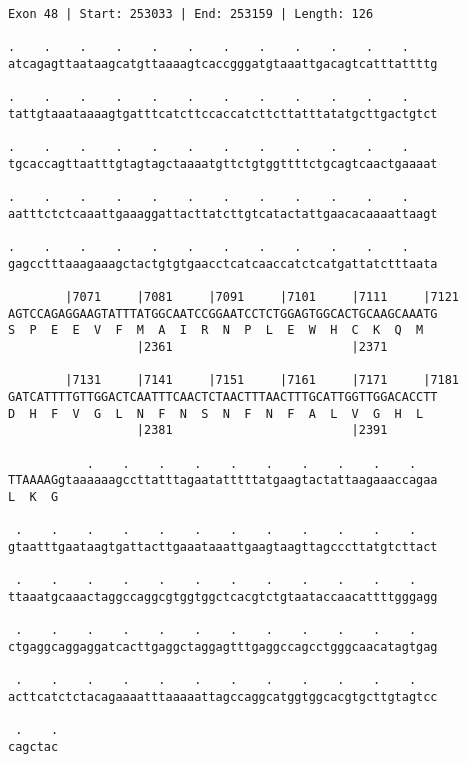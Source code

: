 \documentclass{article}
\begin{document}
\newpage
\begin{Verbatim}
Exon 48 | Start: 253033 | End: 253159 | Length: 126
 
.    .    .    .    .    .    .    .    .    .    .    .    
atcagagttaataagcatgttaaaagtcaccgggatgtaaattgacagtcatttattttg
  
.    .    .    .    .    .    .    .    .    .    .    .    
tattgtaaataaaagtgatttcatcttccaccatcttcttatttatatgcttgactgtct
  
.    .    .    .    .    .    .    .    .    .    .    .    
tgcaccagttaatttgtagtagctaaaatgttctgtggttttctgcagtcaactgaaaat
  
.    .    .    .    .    .    .    .    .    .    .    .    
aatttctctcaaattgaaaggattacttatcttgtcatactattgaacacaaaattaagt
  
.    .    .    .    .    .    .    .    .    .    .    .    
gagcctttaaagaaagctactgtgtgaacctcatcaaccatctcatgattatctttaata
  
        |7071     |7081     |7091     |7101     |7111     |7121
AGTCCAGAGGAAGTATTTATGGCAATCCGGAATCCTCTGGAGTGGCACTGCAAGCAAATG
S  P  E  E  V  F  M  A  I  R  N  P  L  E  W  H  C  K  Q  M  
                  |2361                         |2371       
  
        |7131     |7141     |7151     |7161     |7171     |7181
GATCATTTTGTTGGACTCAATTTCAACTCTAACTTTAACTTTGCATTGGTTGGACACCTT
D  H  F  V  G  L  N  F  N  S  N  F  N  F  A  L  V  G  H  L  
                  |2381                         |2391       
  
           .    .    .    .    .    .    .    .    .    .   
TTAAAAGgtaaaaaagccttatttagaatatttttatgaagtactattaagaaaccagaa
L  K  G                                                     
  
 .    .    .    .    .    .    .    .    .    .    .    .   
gtaatttgaataagtgattacttgaaataaattgaagtaagttagcccttatgtcttact
  
 .    .    .    .    .    .    .    .    .    .    .    .   
ttaaatgcaaactaggccaggcgtggtggctcacgtctgtaataccaacattttgggagg
  
 .    .    .    .    .    .    .    .    .    .    .    .   
ctgaggcaggaggatcacttgaggctaggagtttgaggccagcctgggcaacatagtgag
  
 .    .    .    .    .    .    .    .    .    .    .    .   
acttcatctctacagaaaatttaaaaattagccaggcatggtggcacgtgcttgtagtcc
  
 .    .
cagctac
\end{Verbatim}
\newpage
\end{document}

